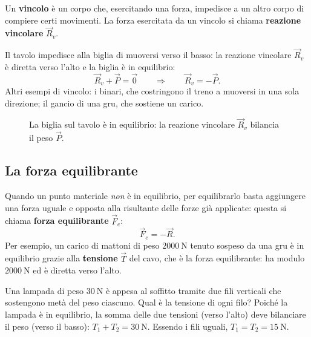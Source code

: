 \begin{definizione}
Un \textbf{vincolo} è un corpo che, esercitando una forza, impedisce a un altro corpo di compiere certi movimenti. La forza esercitata da un vincolo si chiama \textbf{reazione vincolare} $\vec{R}_v$.
\end{definizione}

Il tavolo impedisce alla biglia di muoversi verso il basso: la reazione vincolare $\vec{R}_v$ è diretta verso l'alto e la biglia è in equilibrio:
\[
\vec{R}_v + \vec{P} = \vec{0} \qquad \Longrightarrow \qquad \vec{R}_v = -\vec{P}.
\]
Altri esempi di vincolo: i binari, che costringono il treno a muoversi in una sola direzione; il gancio di una gru, che sostiene un carico.

\begin{figure}[h!]
\centering
{}
\caption{La biglia sul tavolo è in equilibrio: la reazione vincolare $\vec{R}_v$ bilancia il peso $\vec{P}$.}
\label{fig:biglia}
\end{figure}

\subsection{La forza equilibrante}
Quando un punto materiale \emph{non} è in equilibrio, per equilibrarlo basta aggiungere una forza uguale e opposta alla risultante delle forze già applicate: questa si chiama \textbf{forza equilibrante} $\vec{F}_e$:
\[
\vec{F}_e = -\vec{R}.
\]
Per esempio, un carico di mattoni di peso $\SI{2000}{\newton}$ tenuto sospeso da una gru è in equilibrio grazie alla \textbf{tensione} $\vec{T}$ del cavo, che è la forza equilibrante: ha modulo $\SI{2000}{\newton}$ ed è diretta verso l'alto.

\begin{testexample}
Una lampada di peso $\SI{30}{\newton}$ è appesa al soffitto tramite due fili verticali che sostengono metà del peso ciascuno. Qual è la tensione di ogni filo? Poiché la lampada è in equilibrio, la somma delle due tensioni (verso l'alto) deve bilanciare il peso (verso il basso): $T_1 + T_2 = \SI{30}{\newton}$. Essendo i fili uguali, $T_1 = T_2 = \SI{15}{\newton}$.
\end{testexample}

